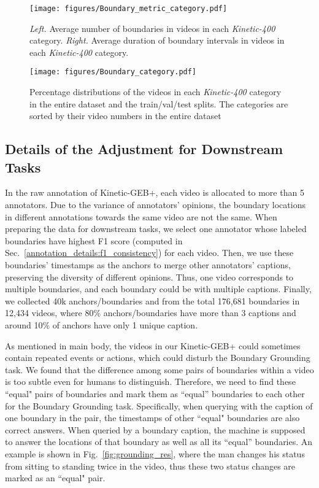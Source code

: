 \documentclass[runningheads]{llncs}
\begin{document}
\begin{figure}[t]
\centering
\texttt{[image: figures/Boundary\_metric\_category.pdf]}
\caption{\textit{Left.} Average number of boundaries in videos in each \textit{Kinetic-400} category. \textit{Right.} Average duration of boundary intervals in videos in each \textit{Kinetic-400} category.}
\label{fig:boundary_metric_category}
\end{figure}

\begin{figure}[t]
\centering
\texttt{[image: figures/Boundary\_category.pdf]}
\caption{Percentage distributions of the videos in each \textit{Kinetic-400} category in the entire dataset and the train/val/test splits. The categories are sorted by their video numbers in the entire dataset}
\label{fig:boundary_category}
\end{figure}


\subsection{Details of the Adjustment for Downstream Tasks}

In the raw annotation of Kinetic-GEB+, each video is allocated to more than 5 annotators. Due to the variance of annotators’ opinions, the boundary locations in different annotations towards the same video are not the same. When preparing the data for downstream tasks, 
we select one annotator whose labeled boundaries have highest F1 score (computed in Sec.~\ref{annotation_details:f1_consistency}) for each video. 
Then, we use these boundaries' timestamps as the anchors to merge other annotators' captions, preserving the diversity of different opinions. 
Thus, one video corresponds to multiple boundaries, and each boundary could be with multiple captions. 
Finally, we collected 40k anchors/boundaries and from the total 176,681 boundaries in 12,434 videos, where 80\% anchors/boundaries have more than 3 captions and around 10\% of anchors have only 1 unique caption.



As mentioned in main body, the videos in our Kinetic-GEB+ could sometimes contain repeated events or actions, which could disturb the Boundary Grounding task. We found that the difference among some pairs of boundaries within a video is too subtle even for humans to distinguish. Therefore, we need to find these ``equal" pairs of boundaries and mark them as ``equal” boundaries to each other for the Boundary Grounding task. Specifically, when querying with the caption of one boundary in the pair, the timestamps of other ``equal" boundaries are also correct answers. When queried by a boundary caption, the machine is supposed to answer the locations of that boundary as well as all its “equal” boundaries. An example is shown in Fig.~\ref{fig:grounding_res}, where the man changes his status from sitting to standing twice in the video, thus these two status changes are marked as an ``equal" pair.
\end{document}
